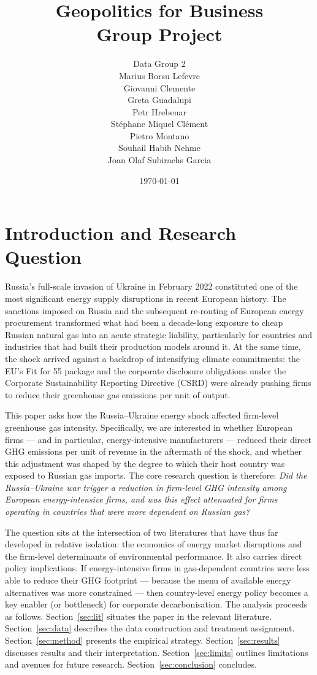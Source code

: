 \documentclass[12pt,a4paper]{article}
\title{Geopolitics for Business \\ Group Project}
\author{
    Data Group 2 \\[2ex]
    \normalsize Marius Borsu Lefevre \\
    \normalsize Giovanni Clemente \\
    \normalsize Greta Guadalupi \\
    \normalsize Petr Hrebenar \\
    \normalsize Stéphane Miquel Clément \\
    \normalsize Pietro Montano \\
    \normalsize Souhail Habib Nehme \\
    \normalsize Joan Olaf Subirachs Garcia
}
\date{\today}
\begin{document}
\maketitle
\newpage
\tableofcontents
\newpage

\section{Introduction and Research Question}

Russia's full-scale invasion of Ukraine in February 2022 constituted one of the most significant energy supply disruptions in recent European history. The sanctions imposed on Russia and the subsequent re-routing of European energy procurement transformed what had been a decade-long exposure to cheap Russian natural gas into an acute strategic liability, particularly for countries and industries that had built their production models around it. At the same time, the shock arrived against a backdrop of intensifying climate commitments: the EU's Fit for 55 package and the corporate disclosure obligations under the Corporate Sustainability Reporting Directive (CSRD) were already pushing firms to reduce their greenhouse gas emissions per unit of output.

This paper asks how the Russia–Ukraine energy shock affected firm-level greenhouse gas intensity. Specifically, we are interested in whether European firms — and in particular, energy-intensive manufacturers — reduced their direct GHG emissions per unit of revenue in the aftermath of the shock, and whether this adjustment was shaped by the degree to which their host country was exposed to Russian gas imports. The core research question is therefore: \textit{Did the Russia–Ukraine war trigger a reduction in firm-level GHG intensity among European energy-intensive firms, and was this effect attenuated for firms operating in countries that were more dependent on Russian gas?}

The question sits at the intersection of two literatures that have thus far developed in relative isolation: the economics of energy market disruptions and the firm-level determinants of environmental performance. It also carries direct policy implications. If energy-intensive firms in gas-dependent countries were less able to reduce their GHG footprint — because the menu of available energy alternatives was more constrained — then country-level energy policy becomes a key enabler (or bottleneck) for corporate decarbonisation. The analysis proceeds as follows. Section~\ref{sec:lit} situates the paper in the relevant literature. Section~\ref{sec:data} describes the data construction and treatment assignment. Section~\ref{sec:method} presents the empirical strategy. Section~\ref{sec:results} discusses results and their interpretation. Section~\ref{sec:limits} outlines limitations and avenues for future research. Section~\ref{sec:conclusion} concludes.
\end{document}
